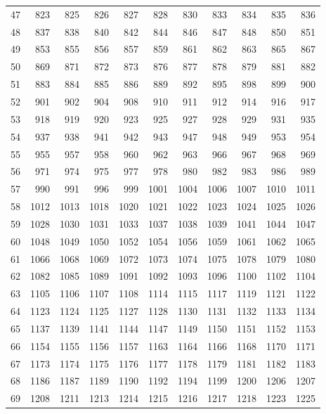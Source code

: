 \begin{longtable}{|r|rrrrrrrrrr|}
  47 & 823 & 825 & 826 & 827 & 828 & 830 & 833 & 834 & 835 & 836 \\ 
  48 & 837 & 838 & 840 & 842 & 844 & 846 & 847 & 848 & 850 & 851 \\ 
  49 & 853 & 855 & 856 & 857 & 859 & 861 & 862 & 863 & 865 & 867 \\ 
  50 & 869 & 871 & 872 & 873 & 876 & 877 & 878 & 879 & 881 & 882 \\ 
  51 & 883 & 884 & 885 & 886 & 889 & 892 & 895 & 898 & 899 & 900 \\ 
  52 & 901 & 902 & 904 & 908 & 910 & 911 & 912 & 914 & 916 & 917 \\ 
  53 & 918 & 919 & 920 & 923 & 925 & 927 & 928 & 929 & 931 & 935 \\ 
  54 & 937 & 938 & 941 & 942 & 943 & 947 & 948 & 949 & 953 & 954 \\ 
  55 & 955 & 957 & 958 & 960 & 962 & 963 & 966 & 967 & 968 & 969 \\ 
  56 & 971 & 974 & 975 & 977 & 978 & 980 & 982 & 983 & 986 & 989 \\ 
  57 & 990 & 991 & 996 & 999 & 1001 & 1004 & 1006 & 1007 & 1010 & 1011 \\ 
  58 & 1012 & 1013 & 1018 & 1020 & 1021 & 1022 & 1023 & 1024 & 1025 & 1026 \\ 
  59 & 1028 & 1030 & 1031 & 1033 & 1037 & 1038 & 1039 & 1041 & 1044 & 1047 \\ 
  60 & 1048 & 1049 & 1050 & 1052 & 1054 & 1056 & 1059 & 1061 & 1062 & 1065 \\ 
  61 & 1066 & 1068 & 1069 & 1072 & 1073 & 1074 & 1075 & 1078 & 1079 & 1080 \\ 
  62 & 1082 & 1085 & 1089 & 1091 & 1092 & 1093 & 1096 & 1100 & 1102 & 1104 \\ 
  63 & 1105 & 1106 & 1107 & 1108 & 1114 & 1115 & 1117 & 1119 & 1121 & 1122 \\ 
  64 & 1123 & 1124 & 1125 & 1127 & 1128 & 1130 & 1131 & 1132 & 1133 & 1134 \\ 
  65 & 1137 & 1139 & 1141 & 1144 & 1147 & 1149 & 1150 & 1151 & 1152 & 1153 \\ 
  66 & 1154 & 1155 & 1156 & 1157 & 1163 & 1164 & 1166 & 1168 & 1170 & 1171 \\ 
  67 & 1173 & 1174 & 1175 & 1176 & 1177 & 1178 & 1179 & 1181 & 1182 & 1183 \\ 
  68 & 1186 & 1187 & 1189 & 1190 & 1192 & 1194 & 1199 & 1200 & 1206 & 1207 \\ 
  69 & 1208 & 1211 & 1213 & 1214 & 1215 & 1216 & 1217 & 1218 & 1223 & 1225 \\ 

\end{longtable}

